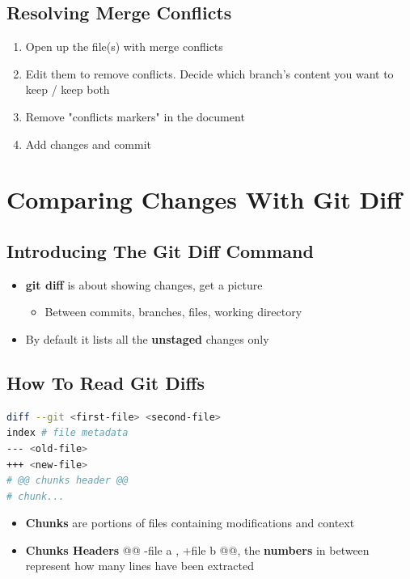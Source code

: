 \documentclass{report}
\begin{document}
 \section{Resolving Merge Conflicts}
 \begin{enumerate}
	 \item Open up the file(s) with merge conflicts 
	 \item Edit them to remove conflicts. Decide which branch's content you want to keep / keep both 
	 \item Remove "conflicts markers" in the document 
	 \item Add changes and commit
 \end{enumerate}



\chapter{Comparing Changes With Git Diff}


\section{Introducing The Git Diff Command}

\begin{itemize}
	\item \textbf{git diff} is about showing changes, get a picture
		\begin{itemize}
			\item Between commits, branches, files, working directory
		\end{itemize}
	\item By default it lists all the \textbf{unstaged} changes only
\end{itemize}


\section{How To Read Git Diffs}

\begin{tcolorbox}[colback=backcolour]
\begin{lstlisting}[language=bash]
diff --git <first-file> <second-file>
index # file metadata
--- <old-file>
+++ <new-file>
# @@ chunks header @@ 
# chunk...
\end{lstlisting}
\end{tcolorbox}

\begin{itemize}
	\item \textbf{Chunks} are portions of files containing modifications and context
	\item \textbf{Chunks Headers} @@ -file a , +file b @@, the \textbf{numbers} in between represent how many lines have been extracted
\end{itemize}
\end{document}
